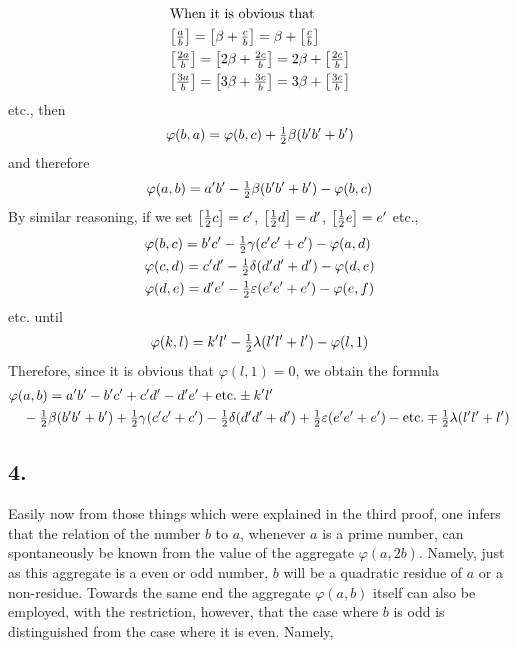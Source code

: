 \documentclass[twoside,12pt, showframe]{memoir}
\let\oldfrac\frac
\def\frac#1#2{\mathchoice{\tfrac{#1}{#2}}{\oldfrac{#1}{#2}}{\genfrac{}{}{}{2}{#1}{#2\mathstrut}}{\genfrac{}{}{}{3}{#1}{#2\mathstrut}}}
\begin{document}
\[\begin{aligned}
& \text{When it is obvious that} \\
& {\left[\frac{a}{b}\right]=\left[\beta+\frac{c}{b}\right]=\beta+\left[\frac{c}{b}\right]} \\
& {\left[\frac{2 a}{b}\right]=\left[2 \beta+\frac{2 c}{b}\right]=2 \beta+\left[\frac{2 c}{b}\right]} \\
& {\left[\frac{3 a}{b}\right]=\left[3 \beta+\frac{3 c}{b}\right]=3 \beta+\left[\frac{3 c}{b}\right]}
\end{aligned}\]
etc., then
\[\varphi(b, a)=\varphi(b, c)+\frac{1}{2} \beta (b^{\prime} b^{\prime}+b^{\prime})\]
and therefore
\[\varphi(a, b)=a^{\prime} b^{\prime}-\frac{1}{2} \beta (b^{\prime} b^{\prime}+b^{\prime})-\varphi(b, c)\]
By similar reasoning, if we set \(\left[\frac{1}{2} c\right]=c^{\prime}\), \(\left[\frac{1}{2} d\right]=d^{\prime}\), \(\left[\frac{1}{2} e\right]=e^{\prime}\) etc.,
\[\begin{aligned}
& \varphi(b, c)=b^{\prime} c^{\prime}-\frac{1}{2} \gamma(c^{\prime} c^{\prime}+c^{\prime})-\varphi(a, d) \\
& \varphi(c, d)=c^{\prime} d^{\prime}-\frac{1}{2} \delta(d^{\prime} d^{\prime}+d^{\prime})-\varphi(d, e) \\
& \varphi(d, e)=d^{\prime} e^{\prime}-\frac{1}{2} \varepsilon(e^{\prime} e^{\prime}+e^{\prime})-\varphi(e, f)
\end{aligned}\]
etc. until
\[\varphi(k, l)=k^{\prime} l^{\prime}-\frac{1}{2} \lambda(l^{\prime} l^{\prime}+l^{\prime})-\varphi(l, 1)\]
Therefore, since it is obvious that \(\varphi(l, 1)=0\), we obtain the formula
\[\begin{aligned}
& \varphi(a, b)=a^{\prime} b^{\prime}-b^{\prime} c^{\prime}+c^{\prime} d^{\prime}-d^{\prime} e^{\prime}+\text{etc.} \pm k^{\prime} l^{\prime} \\
& \quad-\frac{1}{2} \beta (b^{\prime} b^{\prime}+b^{\prime})+\frac{1}{2} \gamma(c^{\prime} c^{\prime}+c^{\prime})-\frac{1}{2} \delta(d^{\prime} d^{\prime}+d^{\prime})+\frac{1}{2} \varepsilon(e^{\prime} e^{\prime}+e^{\prime})-\text{etc.} \mp \frac{1}{2} \lambda(l^{\prime} l^{\prime}+l^{\prime})
\end{aligned}\]
%

\subsection*{4.}
 
Easily now from those things which were explained in the third proof, one infers that the relation of the number \(b\) to \(a\), whenever \(a\) is a prime number, can spontaneously be known from the value of the aggregate \(\varphi(a, 2 b)\). Namely, just as this aggregate is a even or odd number, \(b\) will be a quadratic residue of \(a\) or a non-residue. Towards the same end the aggregate \(\varphi(a, b)\) itself can also be employed, with the restriction, however, that the case where \(b\) is odd is distinguished from the case where it is even. Namely,
 
\end{document}

